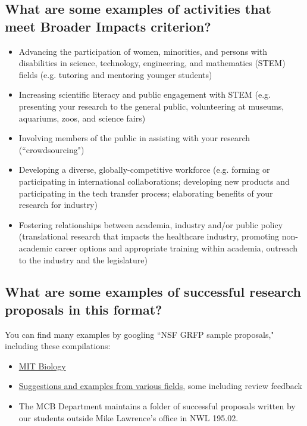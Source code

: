 \documentclass{article}
\begin{document}
\subsection*{What are some examples of activities that meet Broader Impacts criterion?}

\begin{itemize}
\item Advancing the participation of women, minorities, and persons with disabilities in science, technology, engineering, and mathematics (STEM) fields (e.g. tutoring and mentoring younger students)
\item Increasing scientific literacy and public engagement with STEM (e.g. presenting your research to the general public, volunteering at museums, aquariums, zoos, and science fairs)
\item Involving members of the public in assisting with your research (``crowdsourcing")
\item Developing a diverse, globally-competitive workforce (e.g. forming or participating in international collaborations; developing new products and participating in the tech transfer process; elaborating benefits of your research for industry)
\item Fostering relationships between academia, industry and/or public policy (translational research that impacts the healthcare industry, promoting non-academic career options and appropriate training within academia, outreach to the industry and the legislature)
\end{itemize}

\subsection*{What are some examples of successful research proposals in this format?}

You can find many examples by googling ``NSF GRFP sample proposals," including these compilations:
\begin{itemize}
\item \href{https://biology.mit.edu/sites/default/files/NSF_proposals_102309.pdf}{MIT Biology}
\item \href{http://www.alexhunterlang.com/nsf-fellowship}{Suggestions and examples from various fields}, some including review feedback
\item The MCB Department maintains a folder of successful proposals written by our students outside Mike Lawrence's office in NWL 195.02.
\end{itemize}
\end{document}
